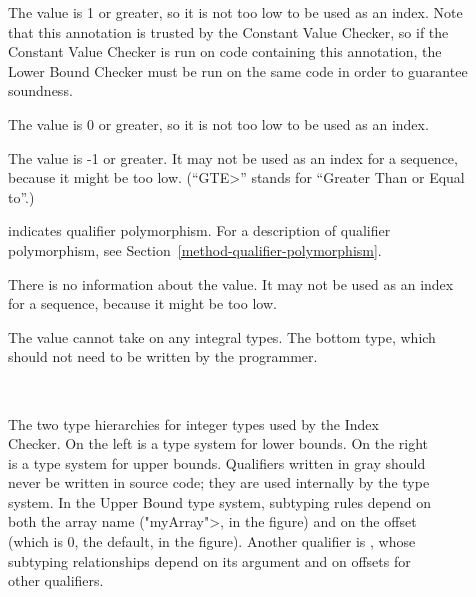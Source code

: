 \begin{description}
\item[]
  The value is 1 or greater, so it is not too low to be used as an index.
  Note that this annotation is trusted by the Constant Value Checker,
  so if the Constant Value Checker is run on code containing this annotation,
  the Lower Bound Checker must be run on the same code in order to
  guarantee soundness.
\item[]
  The value is 0 or greater, so it is not too low to be used as an index.
\item[]
  The value is -1 or greater.
  It may not be used as an index for a sequence, because it might be too low.
  (``\<GTE>'' stands for ``Greater Than or Equal to''.)
\item[]
  indicates qualifier polymorphism.
  For a description of qualifier polymorphism, see
  Section~\ref{method-qualifier-polymorphism}.
\item[]
  There is no information about the value.
  It may not be used as an index for a sequence, because it might be too low.
\item[]
    The value cannot take on any integral types. The bottom type, which
    should not need to be written by the programmer.
\end{description}

\begin{figure}
\begin{center}
  \hfill
  ~~~~\hfill~~~~
  \hfill
\end{center}
  \caption{The two type hierarchies for integer types used by the Index
    Checker.  On the left is a type system for lower bounds.  On the right
    is a type system for upper bounds.  Qualifiers written in gray should
    never be written in source code; they are used internally by the type
    system.
    \newline
    In the Upper Bound type system, subtyping rules depend on both the
    array name (\<"myArray">, in the figure) and on the offset (which is 0,
    the default, in the figure).  Another qualifier is
    , whose subtyping
    relationships depend on its argument and on offsets for other qualifiers.
 }
  \label{fig-index-int-types}
\end{figure}



